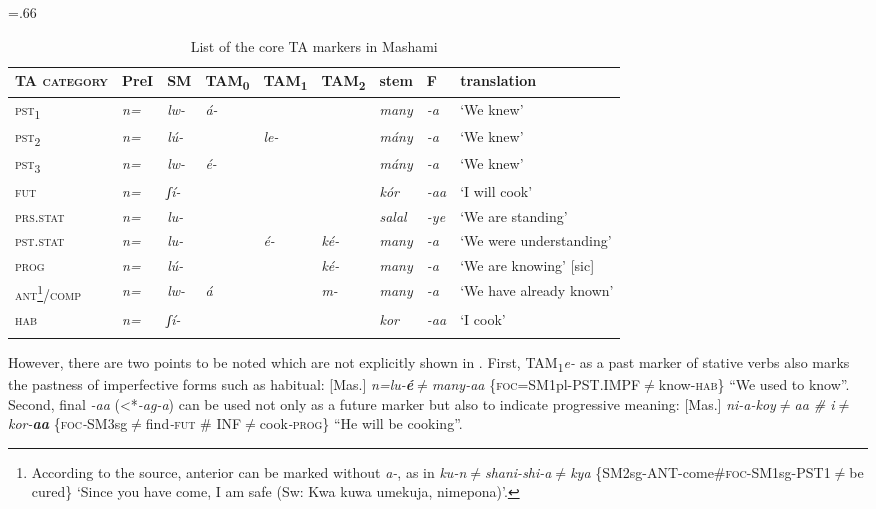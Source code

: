 \documentclass[output=paper]{langscibook}
\begin{document}
\begin{table}
\small\tabcolsep=.66\tabcolsep
\begin{tabularx}{\textwidth}{>{\scshape}llllllllQ}
\lsptoprule
{\normalfont TA category} & PreI & SM & {TAM\textsubscript{0}} & {TAM\textsubscript{1}} & { TAM\textsubscript{2}} & stem & F & { translation}\\
\midrule
pst\textsubscript{1} & {\itshape n=} & {\itshape lw-} & {\itshape á-} &  &  & {\itshape many} & {\itshape {}-a} & `We knew'\\
pst\textsubscript{2} & {\itshape n=} & {\itshape lú-} &  & {\itshape le-} &  & {\itshape mány} & {\itshape {}-a} & `We knew'\\
pst\textsubscript{3} & {\itshape n=} & {\itshape lw-} & {\itshape é-} &  &  & {\itshape mány} & {\itshape {}-a} & `We knew'\\
fut                  & {\itshape n=} & {\itshape ʃí-} &  &  &  & {\itshape kór} & {\itshape {}-aa} & `I will cook'\\
prs.stat             & {\itshape n=} & {\itshape lu-} &  &  &  & {\itshape salal} & {\itshape {}-ye} & `We are standing'\\
pst.stat             & {\itshape n=} & {\itshape lu-} &  & {\itshape é-} & {\itshape ké-} & {\itshape many} & {\itshape {}-a} & `We were understanding'\\
prog                 & {\itshape n=} & {\itshape lú-} &  &  & {\itshape ké-} & {\itshape many} & {\itshape {}-a} & `We are knowing' [sic]\\
ant\footnote{According to the source, anterior can be marked without \textit{a-}, as in \textit{ku-n${\neq}$shani-shi-a${\neq}$kya} \{SM2sg-ANT-come\#\textsc{foc}-SM1sg-PST1${\neq}$be cured\} `Since you have come, I am safe (Sw: Kwa kuwa umekuja, nimepona)'.}/comp & {\itshape n=} & {\itshape lw-} & {\itshape á} &  & {\itshape m-} & {\itshape many} & {\itshape {}-a} & `We have already known'\\
hab                 & {\itshape n=} & {\itshape ʃí-} &  &  &  & {\itshape kor} & {\itshape {}-aa} & `I cook'\\
\lspbottomrule
\end{tabularx}
\caption{List of the core TA markers in Mashami}
\label{tab:shinagawa:5}
\end{table}


However, there are two points to be noted which are not explicitly shown in . First, TAM\textsubscript{1}\textit{e-} as a past marker of stative verbs also marks the pastness of imperfective forms such as habitual: [Mas.] \textit{n=lu-}\textbf{\textit{é}}\textit{${\neq}$many-aa} \{\textsc{foc}=SM1pl-PST.IMPF${\neq}$know-\textsc{hab}\} “We used to know”. Second, final \textit{{}-aa} (<*\textit{{}-ag-a}) can be used not only as a future marker but also to indicate progressive meaning: [Mas.] \textit{ni-a-koy}${\neq}$\textit{aa \# i}${\neq}$\textit{kor-}\textbf{\textit{aa} }\{\textsc{foc}\textit{{}-}SM3sg${\neq}$find\textit{{}-}\textsc{fut} \# INF${\neq}$cook\textit{{}-}\textsc{prog}\} “He will be cooking”.
\end{document}
